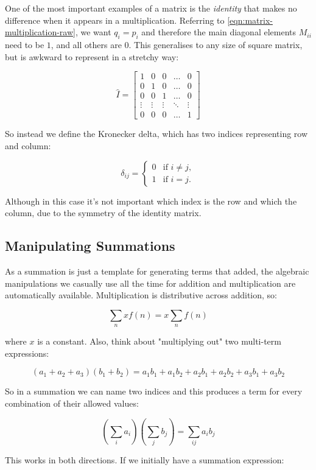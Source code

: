 One of the most important examples of a matrix is the \textit{identity} that makes no difference when it appears in a multiplication. Referring to \eqref{eqn:matrix-multiplication-raw}, we want $q_i = p_i$ and therefore the main diagonal elements $M_{ii}$ need to be $1$, and all others are $0$. This generalises to any size of square matrix, but is awkward to represent in a stretchy way:

$$
\hat{I} = \begin{bmatrix}
1 & 0 & 0 & \dots & 0 \\
0 & 1 & 0 & \dots & 0 \\
0 & 0 & 1 & \dots & 0 \\
\vdots & \vdots & \vdots & \ddots & \vdots\\
0 & 0 & 0 & \dots & 1
\end{bmatrix}
$$

So instead we define the Kronecker delta, which has two indices representing row and column:

$$
\delta_{ij} = \begin{cases}
0 &\text{if } i \neq j,   \\
1 &\text{if } i=j.   \end{cases}
$$

Although in this case it's not important which index is the row and which the column, due to the symmetry of the identity matrix.

\subsection{Manipulating Summations}

As a summation is just a template for generating terms that added, the algebraic manipulations we casually use all the time for addition and multiplication are automatically available. Multiplication is distributive across addition, so:

$$
\sum_{n} x f(n) = x \sum_{n} f(n)
$$

where $x$ is a constant. Also, think about "multiplying out" two multi-term expressions:

$$
(a_1 + a_2 + a_3)(b_1 + b_2) = a_1b_1 + a_1b_2 + a_2b_1 + a_2b_2 + a_3b_1 + a_3b_2  
$$

So in a summation we can name two indices and this produces a term for every combination of their allowed values:

$$
\left( \sum_{i} a_i \right) \left( \sum_{j} b_j \right) = \sum_{ij} a_i b_j
$$

This works in both directions. If we initially have a summation expression:


